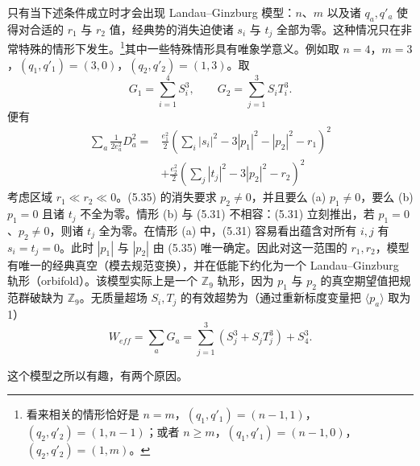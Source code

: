 只有当下述条件成立时才会出现 Landau--Ginzburg 模型：$n$、$m$ 以及诸 $q_a,q'_a$ 使得对合适的 $r_1$ 与 $r_2$ 值，经典势的消失迫使诸 $s_i$ 与 $t_j$%
\label{op:65}
全部为零。这种情况只在非常特殊的情形下发生。\footnote{看来相关的情形恰好是 $n=m$，$(q_1,q'_1)=(n-1,1)$，$(q_2,q'_2)=(1,n-1)$；或者 $n\ge m$，$(q_1,q'_1)=(n-1,0)$，$(q_2,q'_2)=(1,m)$。}其中一些特殊情形具有唯象学意义。例如取 $n=4$，$m=3$，$(q_1,q'_1)=(3,0)$，$(q_2,q'_2)=(1,3)$。取
\begin{equation}\tag{5.34}
G_1=\sum_{i=1}^{4}S_i^{3},\qquad G_2=\sum_{j=1}^{3}S_iT_i^{3}.
\end{equation}
便有
\begin{equation}\tag{5.35}
\begin{aligned}
\sum_a\frac{1}{2e_a^2}D_a^2={}&\frac{e_1^2}{2}\left(\sum_i|s_i|^2-3|p_1|^2-|p_2|^2-r_1\right)^2\\
&+\frac{e_2^2}{2}\left(\sum_j|t_j|^2-3|p_2|^2-r_2\right)^2
\end{aligned}
\end{equation}
考虑区域 $r_1\ll r_2\ll0$。(5.35) 的消失要求 $p_2\neq0$，并且要么 (a) $p_1\neq0$，要么 (b) $p_1=0$ 且诸 $t_j$ 不全为零。情形 (b) 与 (5.31) 不相容：(5.31) 立刻推出，若 $p_1=0$、$p_2\neq0$，则诸 $t_j$ 全为零。在情形 (a) 中，(5.31) 容易看出蕴含对所有 $i,j$ 有 $s_i=t_j=0$。此时 $|p_1|$ 与 $|p_2|$ 由 (5.35) 唯一确定。因此对这一范围的 $r_1,r_2$，模型有唯一的经典真空（模去规范变换），并在低能下约化为一个 Landau--Ginzburg 轨形（orbifold）。该模型实际上是一个 $\mathbb{Z}_9$ 轨形，因为 $p_1$ 与 $p_2$ 的真空期望值把规范群破缺为 $\mathbb{Z}_9$。无质量超场 $S_i,T_j$ 的有效超势为（通过重新标度变量把 $\langle p_a\rangle$ 取为 1）
\begin{equation}\tag{5.36}
W_{eff}=\sum_a G_a=\sum_{j=1}^{3}\left(S_j^{3}+S_jT_j^{3}\right)+S_4^{3}.
\end{equation}


这个模型之所以有趣，有两个原因。
